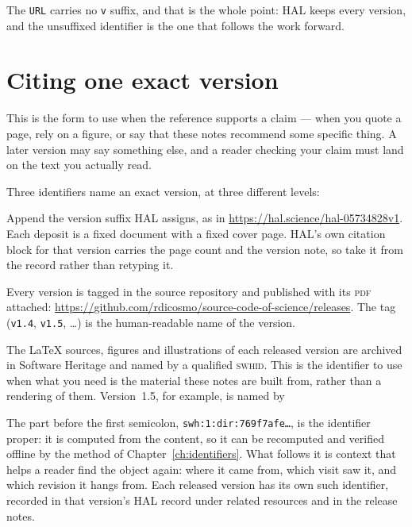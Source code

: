 \noindent The \texttt{URL} carries no \texttt{v} suffix, and that is the whole point: HAL keeps
every version, and the unsuffixed identifier is the one that follows the work forward.

\section{Citing one exact version}

This is the form to use when the reference supports a claim --- when you quote a page, rely on a
figure, or say that these notes recommend some specific thing. A later version may say something
else, and a reader checking your claim must land on the text you actually read.

Three identifiers name an exact version, at three different levels:

\begin{description}[leftmargin=1.6em,itemsep=2pt]
\item[The HAL record, versioned.] Append the version suffix HAL assigns, as in
  \url{https://hal.science/hal-05734828v1}. Each deposit is a fixed document with a fixed cover
  page. HAL's own citation block for that version carries the page count and the version note,
  so take it from the record rather than retyping it.
\item[The release.] Every version is tagged in the source repository and published with its
  \textsc{pdf} attached:
  \url{https://github.com/rdicosmo/source-code-of-science/releases}. The tag (\texttt{v1.4},
  \texttt{v1.5}, \dots) is the human-readable name of the version.
\item[The source tree.] The \LaTeX{} sources, figures and illustrations of each released version
  are archived in Software Heritage and named by a qualified \textsc{swhid}. This is the
  identifier to use when what you need is the material these notes are built from, rather than a
  rendering of them. Version~1.5, for example, is named by
  \begin{quote}\footnotesize
  \end{quote}
  \vspace{-4pt}
  The part before the first semicolon, \texttt{swh:1:dir:769f7afe\dots}, is the identifier
  proper: it is computed from the content, so it can be recomputed and verified offline by the
  method of Chapter~\ref{ch:identifiers}. What follows it is context that helps a reader find the
  object again: where it came from, which visit saw it, and which revision it hangs from. Each
  released version has its own such identifier, recorded in that version's HAL record under
  related resources and in the release notes.
\end{description}

